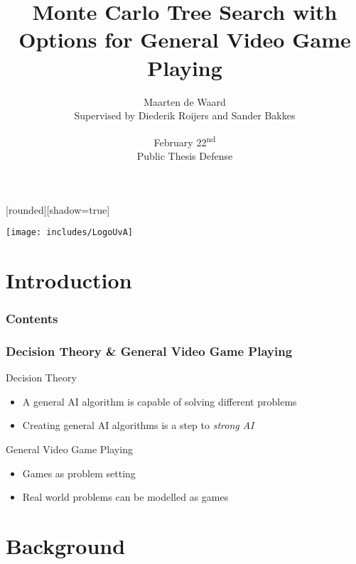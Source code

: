 \documentclass[aspectratio=169]{beamer}
\author[Maarten de Waard]{Maarten de Waard\\\small{Supervised by Diederik
	Roijers and Sander Bakkes}}
\title[O-MCTS for GVGP]{Monte Carlo Tree Search with Options for General Video Game Playing}
\date{February 22\textsuperscript{nd}\\Public Thesis Defense}
\begin{document}
[rounded][shadow=true]
\begin{frame}
	\vspace{-4.7em}
	\centerline{
	\texttt{[image: includes/LogoUvA]}
	}
	\maketitle
\end{frame}

\section{Introduction}

\begin{frame}
	\frametitle{Contents}
	\tableofcontents
\end{frame}

\begin{frame}
	\frametitle{Decision Theory \& General Video Game Playing}
	\begin{block}{Decision Theory}
		\begin{itemize}
			\item A general AI algorithm is capable of solving different problems
			\item Creating general AI algorithms is a step to \emph{strong AI}
		\end{itemize}
	\end{block}
	\begin{block}{General Video Game Playing}
		\begin{itemize}
			\item Games as problem setting
			\item Real world problems can be modelled as games
		\end{itemize}
	\end{block}
\end{frame}

\section{Background}
\end{document}
